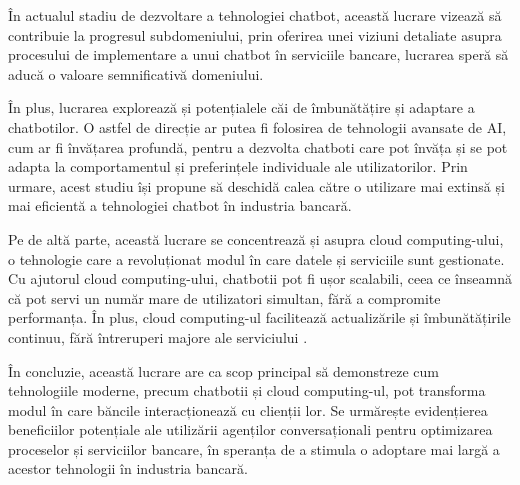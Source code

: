 În actualul stadiu de dezvoltare a tehnologiei chatbot, această lucrare vizează să contribuie la progresul subdomeniului, prin oferirea unei viziuni detaliate asupra procesului de implementare a unui chatbot în serviciile bancare, lucrarea speră să aducă o valoare semnificativă domeniului.

În plus, lucrarea explorează și potențialele căi de îmbunătățire și adaptare a chatbotilor. O astfel de direcție ar putea fi folosirea de tehnologii avansate de AI, cum ar fi învățarea profundă, pentru a dezvolta chatboti care pot învăța și se pot adapta la comportamentul și preferințele individuale ale utilizatorilor. Prin urmare, acest studiu își propune să deschidă calea către o utilizare mai extinsă și mai eficientă a tehnologiei chatbot în industria bancară.

Pe de altă parte, această lucrare se concentrează și asupra cloud computing-ului, o tehnologie care a revoluționat modul în care datele și serviciile sunt gestionate. Cu ajutorul cloud computing-ului, chatbotii pot fi ușor scalabili, ceea ce înseamnă că pot servi un număr mare de utilizatori simultan, fără a compromite performanța. În plus, cloud computing-ul facilitează actualizările și îmbunătățirile continuu, fără întreruperi majore ale serviciului \cite{mell_grance2011}.

În concluzie, această lucrare are ca scop principal să demonstreze cum tehnologiile moderne, precum chatbotii și cloud computing-ul, pot transforma modul în care băncile interacționează cu clienții lor. Se urmărește evidențierea beneficiilor potențiale ale utilizării agenților conversaționali pentru optimizarea proceselor și serviciilor bancare, în speranța de a stimula o adoptare mai largă a acestor tehnologii în industria bancară.